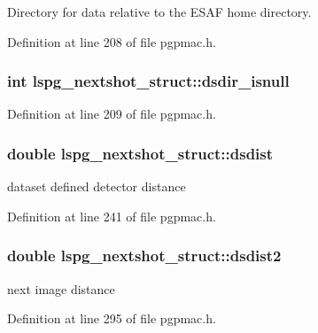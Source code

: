 Directory for data relative to the E\-S\-A\-F home directory. 



Definition at line 208 of file pgpmac.\-h.

\hypertarget{structlspg__nextshot__struct_a8dea57b78b92d67d83ccbb6ed6da13ca}{
\subsubsection[{dsdir\-\_\-isnull}]{\setlength{\rightskip}{0pt plus 5cm}int lspg\-\_\-nextshot\-\_\-struct\-::dsdir\-\_\-isnull}}\label{structlspg__nextshot__struct_a8dea57b78b92d67d83ccbb6ed6da13ca}


Definition at line 209 of file pgpmac.\-h.

\hypertarget{structlspg__nextshot__struct_acab9431a911f5bb11296cbfb271fb83a}{
\subsubsection[{dsdist}]{\setlength{\rightskip}{0pt plus 5cm}double lspg\-\_\-nextshot\-\_\-struct\-::dsdist}}\label{structlspg__nextshot__struct_acab9431a911f5bb11296cbfb271fb83a}


dataset defined detector distance 



Definition at line 241 of file pgpmac.\-h.

\hypertarget{structlspg__nextshot__struct_a516827749068577217b27860a01e6041}{
\subsubsection[{dsdist2}]{\setlength{\rightskip}{0pt plus 5cm}double lspg\-\_\-nextshot\-\_\-struct\-::dsdist2}}\label{structlspg__nextshot__struct_a516827749068577217b27860a01e6041}


next image distance 



Definition at line 295 of file pgpmac.\-h.

